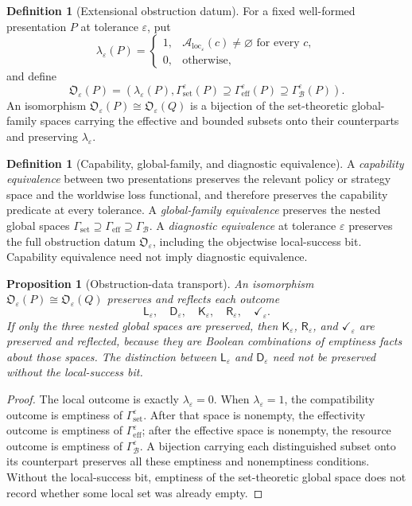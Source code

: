 \documentclass[11pt]{article}
\theoremstyle{plain}
\newtheorem{proposition}[theorem]{Proposition}
\theoremstyle{definition}
\newtheorem{definition}[theorem]{Definition}
\theoremstyle{remark}
\newcommand{\LocalAdm}{\mathcal{A}_{\mathrm{loc}}}
\newcommand{\eps}{\varepsilon}
\begin{document}
\begin{definition}[Extensional obstruction datum]
\label{def:obstruction-datum}
For a fixed well-formed presentation $P$ at tolerance $\eps$, put
\[
\lambda_\eps(P)=
\begin{cases}
1,&\LocalAdm_\eps(c)\ne\varnothing\text{ for every }c,\\
0,&\text{otherwise},
\end{cases}
\]
and define
\[
\mathfrak O_\eps(P)=
\left(
\lambda_\eps(P),
\Gamma_{\mathrm{set}}^\eps(P)
\supseteq\Gamma_{\mathrm{eff}}^\eps(P)
\supseteq\Gamma_{\mathcal B}^\eps(P)
\right).
\]
An isomorphism $\mathfrak O_\eps(P)\cong\mathfrak O_\eps(Q)$ is a bijection of
the set-theoretic global-family spaces carrying the effective and bounded
subsets onto their counterparts and preserving $\lambda_\eps$.
\end{definition}

\begin{definition}[Capability, global-family, and diagnostic equivalence]
\label{def:equivalence-levels}
A \emph{capability equivalence} between two presentations preserves the relevant
policy or strategy space and the worldwise loss functional, and therefore
preserves the capability predicate at every tolerance. A \emph{global-family
equivalence} preserves the nested global spaces
$\Gamma_{\mathrm{set}}\supseteq\Gamma_{\mathrm{eff}}\supseteq
\Gamma_{\mathcal B}$. A \emph{diagnostic equivalence} at tolerance $\eps$
preserves the full obstruction datum $\mathfrak O_\eps$, including the
objectwise local-success bit. Capability equivalence need not imply diagnostic
equivalence.
\end{definition}

\begin{proposition}[Obstruction-data transport]
\label{prop:obstruction-transport}
An isomorphism $\mathfrak O_\eps(P)\cong\mathfrak O_\eps(Q)$ preserves and
reflects each outcome
\[
\mathsf L_\eps,\quad\mathsf D_\eps,\quad
\mathsf K_\eps,\quad\mathsf R_\eps,\quad\checkmark_\eps.
\]
If only the three nested global spaces are preserved, then
$\mathsf K_\eps$, $\mathsf R_\eps$, and $\checkmark_\eps$ are preserved and
reflected, because they are Boolean combinations of emptiness facts about those
spaces. The distinction between $\mathsf L_\eps$ and $\mathsf D_\eps$ need not
be preserved without the local-success bit.
\end{proposition}

\begin{proof}
The local outcome is exactly $\lambda_\eps=0$. When $\lambda_\eps=1$, the
compatibility outcome is emptiness of $\Gamma_{\mathrm{set}}^\eps$. After that
space is nonempty, the effectivity outcome is emptiness of
$\Gamma_{\mathrm{eff}}^\eps$; after the effective space is nonempty, the
resource outcome is emptiness of $\Gamma_{\mathcal B}^\eps$. A bijection
carrying each distinguished subset onto its counterpart preserves all these
emptiness and nonemptiness conditions. Without the local-success bit, emptiness
of the set-theoretic global space does not record whether some local set was
already empty.
\end{proof}
\end{document}
